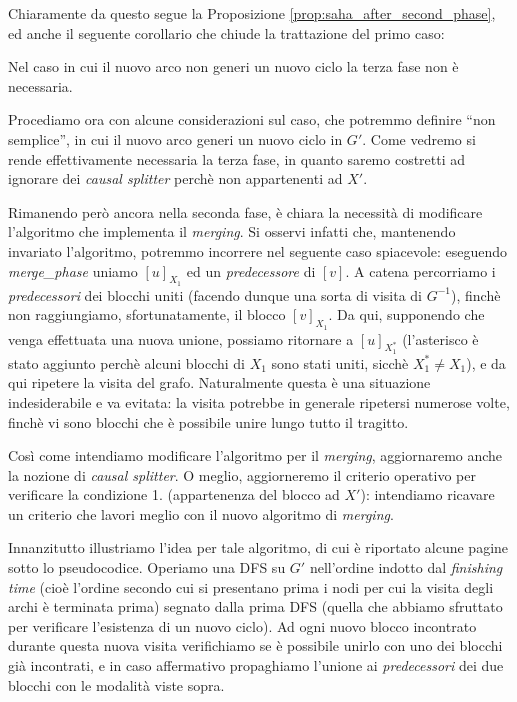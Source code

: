 Chiaramente da questo segue la Proposizione \ref{prop:saha_after_second_phase}, ed anche il seguente corollario che chiude la trattazione del primo caso:
\begin{corollary}
    Nel caso in cui il nuovo arco non generi un nuovo ciclo la terza fase non è necessaria.
\end{corollary}

Procediamo ora con alcune considerazioni sul caso, che potremmo definire ``non semplice'', in cui il nuovo arco generi un nuovo ciclo in $G'$. Come vedremo si rende effettivamente necessaria la terza fase, in quanto saremo costretti ad ignorare dei \emph{causal splitter} perchè non appartenenti ad $X'$.

Rimanendo però ancora nella seconda fase, è chiara la necessità di modificare l'algoritmo che implementa il \emph{merging}. Si osservi infatti che, mantenendo invariato l'algoritmo, potremmo incorrere nel seguente caso spiacevole: eseguendo \emph{merge\_phase} uniamo $[u]_{X_1}$ ed un \emph{predecessore} di $[v]$. A catena percorriamo i \emph{predecessori} dei blocchi uniti (facendo dunque una sorta di visita di $G^{-1}$), finchè non raggiungiamo, sfortunatamente, il blocco $[v]_{X_1}$. Da qui, supponendo che venga effettuata una nuova unione, possiamo ritornare a $[u]_{X_1^*}$ (l'asterisco è stato aggiunto perchè alcuni blocchi di $X_1$ sono stati uniti, sicchè $X_1^* \neq X_1$), e da qui ripetere la visita del grafo. Naturalmente questa è una situazione indesiderabile e va evitata: la visita potrebbe in generale ripetersi numerose volte, finchè vi sono blocchi che è possibile unire lungo tutto il tragitto.

Così come intendiamo modificare l'algoritmo per il \emph{merging}, aggiornaremo anche la nozione di \emph{causal splitter}. O meglio, aggiorneremo il criterio operativo per verificare la condizione 1. (appartenenza del blocco ad $X'$): intendiamo ricavare un criterio che lavori meglio con il nuovo algoritmo di \emph{merging}.

Innanzitutto illustriamo l'idea per tale algoritmo, di cui è riportato alcune pagine sotto lo pseudocodice. Operiamo una DFS su $G'$  nell'ordine indotto dal \emph{finishing time} (cioè l'ordine secondo cui si presentano prima i nodi per cui la visita degli archi è terminata prima) segnato dalla prima DFS (quella che abbiamo sfruttato per verificare l'esistenza di un nuovo ciclo). Ad ogni nuovo blocco incontrato durante questa nuova visita verifichiamo se è possibile unirlo con uno dei blocchi già incontrati, e in caso affermativo propaghiamo l'unione ai \emph{predecessori} dei due blocchi con le modalità viste sopra.

